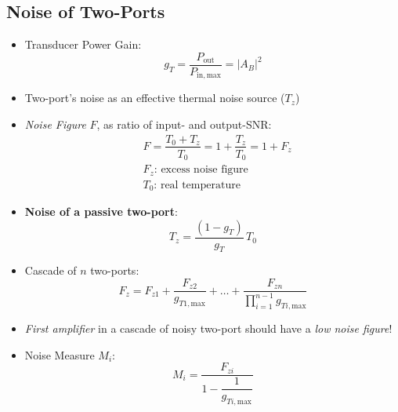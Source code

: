 \subsection{Noise of Two-Ports}
\begin{itemize}
    \item Transducer Power Gain:
        \begin{equation*}
            g_T = \dfrac{P_{\mathrm{out}}}{P_{\mathrm{in},\mathrm{max}}} = |A_B|^2
        \end{equation*}
    \item Two-port's noise as an effective thermal noise source ($T_z$)
    \item \textit{Noise Figure} $F$, as ratio of input- and output-SNR:
        \begin{align*}
            &F = \dfrac{T_0 + T_z}{T_0} = 1 + \dfrac{T_z}{T_0} = 1 + F_z\\
            &F_z\text{: excess noise figure}\\
            &T_0\text{: real temperature}
        \end{align*}
    \item \textbf{Noise of a passive two-port}:
        \begin{equation*}
            T_z = \dfrac{(1 - g_T)}{g_T}\,T_0
        \end{equation*}
    \item Cascade of $n$ two-ports:
        \begin{equation*}
            F_z = F_{z1} + \dfrac{F_{z2}}{g_{T1,\mathrm{max}}} +\dots+\dfrac{F_{zn}}{\prod\limits_{i=1}^{n-1}g_{Ti,\mathrm{max}}}
        \end{equation*}
    \item \textit{First amplifier} in a cascade of noisy two-port should have a \textit{low noise figure}!
    \item Noise Measure $M_i$:
        \begin{equation*}
            M_i = \dfrac{F_{zi}}{1 - \dfrac{1}{g_{Ti,\mathrm{max}}}}
        \end{equation*}
\end{itemize}

